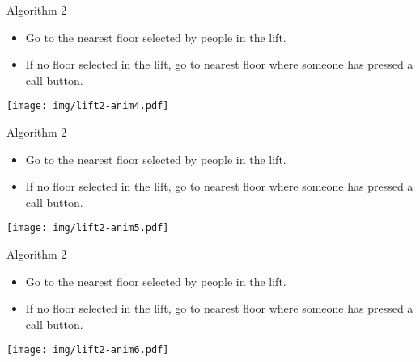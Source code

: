 \documentclass{beamer} %
\begin{document}
\begin{frame}
  \vspace{-10mm}
  \begin{block}{Algorithm 2}
    \begin{itemize}
    \item Go to the nearest floor selected by people in the lift.
    \item If no floor selected in the lift, go to nearest floor where someone has pressed a call button.
    \end{itemize}
  \end{block}
  \centering
  \texttt{[image: img/lift2-anim4.pdf]}

\end{frame}

\begin{frame}
  \vspace{-10mm}
  \begin{block}{Algorithm 2}
    \begin{itemize}
    \item Go to the nearest floor selected by people in the lift.
    \item If no floor selected in the lift, go to nearest floor where someone has pressed a call button.
    \end{itemize}
  \end{block}
  \centering
  \texttt{[image: img/lift2-anim5.pdf]}
\end{frame}

\begin{frame}
  \vspace{-10mm}
  \begin{block}{Algorithm 2}
    \begin{itemize}
    \item Go to the nearest floor selected by people in the lift.
    \item If no floor selected in the lift, go to nearest floor where someone has pressed a call button.
    \end{itemize}
  \end{block}
  \centering
  \texttt{[image: img/lift2-anim6.pdf]}
\end{frame}
\end{document}
